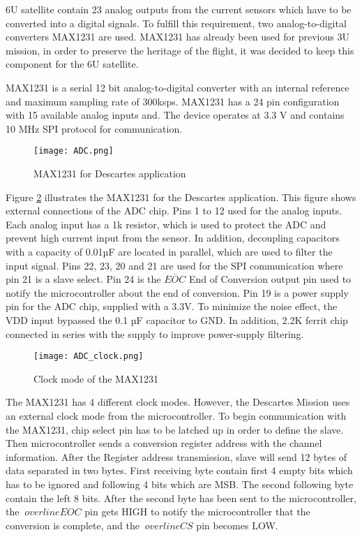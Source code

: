  6U satellite contain 23 analog outputs from the current sensors which have to be converted into a digital signals. To fulfill this requirement, two analog-to-digital converters MAX1231 are used. MAX1231 has already been used for previous 3U mission, in order to preserve the heritage of the flight, it was decided to keep this component for the 6U satellite.
 
  \cite{25}MAX1231 is a serial 12 bit  analog-to-digital converter with an internal reference and maximum sampling rate of 300ksps. MAX1231 has a 24 pin configuration with 15 available analog inputs and. The device operates at 3.3 V and contains 10 MHz SPI protocol for communication.
  
   \begin{figure}[h]
   	\centering
   	\texttt{[image: ADC.png]}
   	\caption{MAX1231 for Descartes application}
   	\label{fig: adc}
   \end{figure} 
 
  Figure \ref{fig: adc} illustrates the MAX1231 for the Descartes application. This figure shows external connections of the ADC chip. Pins 1 to 12 used for the analog inputs. Each analog input has a 1k resistor, which is used to protect the ADC and prevent high current input from the sensor. In addition, decoupling capacitors with a capacity of 0.01µF are located in parallel, which are used to filter the input signal. Pins 22, 23, 20 and 21 are used for the SPI communication where pin 21 is a slave select. Pin 24 is the $\overline{EOC}$ End of Conversion output pin used to notify the microcontroller about the end of conversion. Pin 19 is a power supply pin for the ADC chip, supplied with a 3.3V. To minimize the noise effect, the VDD input bypassed the 0.1 µF capacitor to GND. In addition, 2.2K ferrit chip connected in series with the supply to improve power-supply filtering. 
 
  \begin{figure}[h]
  	\centering
  	\texttt{[image: ADC\_clock.png]}
  	\caption{Clock mode of the MAX1231 \cite{25}}
  	\label{fig: adc}
  \end{figure} 
 
 The MAX1231 has 4 different clock modes. However, the Descartes Mission uses an external clock mode from the microcontroller.  To begin communication with the MAX1231, chip select pin has to be latched up in order to define the slave. Then microcontroller sends a conversion register address with the channel information. After the Register address transmission, slave will send 12 bytes of data separated in two bytes. First receiving byte contain first 4 empty bits which has to be ignored and following 4 bits which are MSB. The second following byte contain the left 8 bits. After the second byte has been sent to the microcontroller, the $ \ overline {EOC} $ pin gets HIGH to notify the microcontroller that the conversion is complete, and the $ \ overline {CS} $ pin becomes LOW.
 
